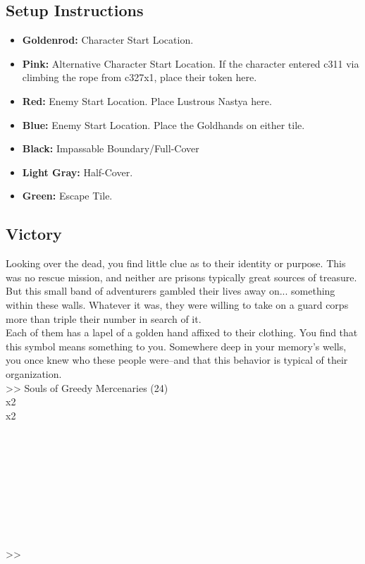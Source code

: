 \subsection*{Setup Instructions}
\begin{itemize}
\item \textbf{Goldenrod:} Character Start Location.
\item \textbf{Pink:} Alternative Character Start Location. If the character entered c311 via climbing the rope from c327x1, place their token here.
\item \textbf{Red:} Enemy Start Location. Place Lustrous Nastya here.
\item \textbf{Blue:} Enemy Start Location. Place the Goldhands on either tile.
\item \textbf{Black:} Impassable Boundary/Full-Cover
\item \textbf{Light Gray:} Half-Cover.
\item \textbf{Green:} Escape Tile.
\end{itemize}

\pagebreak

\subsection*{Victory}
Looking over the dead, you find little clue as to their identity or purpose. This was no rescue mission, and neither are prisons typically great sources of treasure. But this small band of adventurers gambled their lives away on... something within these walls. Whatever it was, they were willing to take on a guard corps more than triple their number in search of it.\\

Each of them has a lapel of a golden hand affixed to their clothing. You find that this symbol means something to you. Somewhere deep in your memory’s wells, you once knew who these people were--and that this behavior is typical of their organization.\\

>> Souls of Greedy Mercenaries (24)\\
 x2\\
 x2\\
\\
\\
\\
\\
\\
\\
\\
\\
\\
>> 


